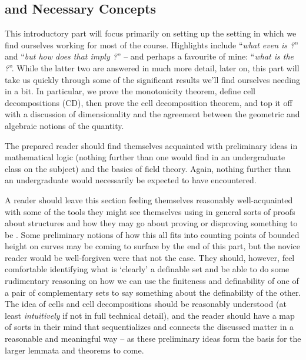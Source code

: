 % 
%
%

\begin{partbacktext}
\part{\Omy and Necessary Concepts}
\noindent This introductory part will focus primarily on setting up the setting in which we find ourselves working for most of the course. Highlights include ``\emph{what even is \omy?}'' and ``\emph{but how does that imply \pw?}'' -- and perhaps a favourite of mine: ``\emph{what is the \pwt?}''. While the latter two are answered in much more detail, later on, this part will take us quickly through some of the significant results we'll find ourselves needing in a bit. In particular, we prove the monotonicity theorem, define cell decompositions (CD), then prove the cell decomposition theorem, and top it off with a discussion of dimensionality and the agreement between the geometric and algebraic notions of the quantity.

The prepared reader should find themselves acquainted with preliminary ideas in mathematical logic (nothing further than one would find in an undergraduate class on the subject) and the basics of field theory. Again, nothing further than an undergraduate would necessarily be expected to have encountered.

A reader should leave this section feeling themselves reasonably well-acquainted with some of the tools they might see themselves using in general sorts of proofs about \om structures and how they may go about proving or disproving something to be \om. Some preliminary notions of how this all fits into counting points of bounded height on curves may be coming to surface by the end of this part, but the novice reader would be well-forgiven were that not the case. They should, however, feel comfortable identifying what is `clearly' a definable set and be able to do some rudimentary reasoning on how we can use the finiteness and definability of one of a pair of complementary sets to say something about the definability of the other. The idea of cells and cell decompositions should be reasonably understood (at least \emph{intuitively} if not in full technical detail), and the reader should have a map of sorts in their mind that sequentializes and connects the discussed matter in a reasonable and meaningful way -- as these preliminary ideas form the basis for the larger lemmata and theorems to come.

\end{partbacktext}

